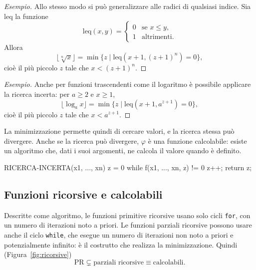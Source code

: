 \documentclass[a4paper, 11pt, oneside]{book}
\theoremstyle{formale}
\newenvironment{esempio}
    {\begin{proof}[\textit{Esempio}]\renewcommand{\qedsymbol}{$\diamond$}}
    {\end{proof}}
\begin{document}
    \begin{esempio}
        Allo stesso modo si pu\`o generalizzare alle radici di qualsiasi indice. Sia
        $\mathrm{leq}$ la funzione
        \begin{equation*}
            \mathrm{leq}(x, y) =
            \begin{cases}
                0 & \text{se } x \leq y, \\
                1 & \text{altrimenti}.
            \end{cases}
        \end{equation*}
        Allora
        \begin{equation*}
            \lfloor \sqrt[n]{x} \rfloor
            = \min \{z \mid \mathrm{leq}(x + 1, (z + 1)^n) = 0\},
        \end{equation*}
        cio\`e il pi\`u piccolo $z$ tale che $x < (z + 1)^n$.
    \end{esempio}

    \begin{esempio}
        Anche per funzioni trascendenti come il logaritmo \`e possibile applicare la
        ricerca incerta: per $a \geq 2$ e $x \geq 1$,
        \begin{equation*}
            \lfloor \log_a x \rfloor = \min \{z \mid \mathrm{leq}(x + 1, a^{z+1}) = 0\},
        \end{equation*}
        cio\`e il pi\`u piccolo $z$ tale che $x < a^{z+1}$.
    \end{esempio}

    La minimizzazione permette quindi di cercare valori, e la ricerca stessa pu\`o
    divergere. Anche se la ricerca pu\`o divergere, $\varphi$ \`e una funzione
    calcolabile: esiste un algoritmo che, dati i suoi argomenti, ne calcola il valore
    quando \`e definito.
\begin{codice}
RICERCA-INCERTA(x1, ..., xn)
    z = 0
    while f(x1, ..., xn, z) != 0 { z++; }
    return z;
\end{codice}

    \subsection{Funzioni ricorsive e calcolabili}
    Descritte come algoritmo, le funzioni primitive ricorsive usano solo cicli
    \texttt{for}, con un numero di iterazioni noto a priori. Le funzioni parziali
    ricorsive possono usare anche il ciclo \texttt{while}, che esegue un numero di
    iterazioni non noto a priori e potenzialmente infinito: \`e il costrutto che realizza
    la minimizzazione. Quindi (Figura~\ref{fig:ricorsive})
    \begin{equation*}
        \mathrm{PR} \subsetneq \text{parziali ricorsive} \equiv \text{calcolabili}.
    \end{equation*}
\end{document}

